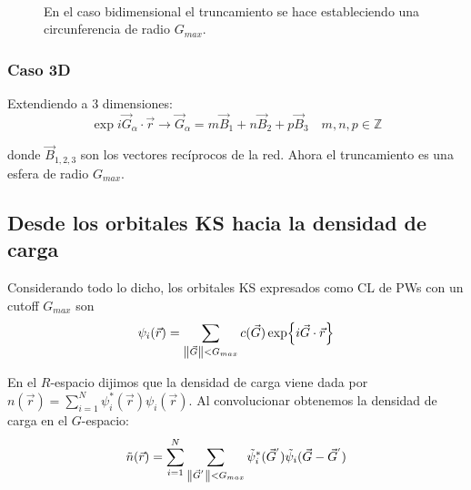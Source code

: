 \begin{figure}[H]
         \\
        \caption{En el caso bidimensional el truncamiento se hace estableciendo una circunferencia de radio $G_{max}$.}
        \label{fig:FT_2D}
    \end{figure}

\subsubsection{Caso 3D}

  Extendiendo a 3 dimensiones:
    $$\exp{i \vec{G}_{\alpha} \cdot \vec{r}} \rightarrow \vec{G}_{\alpha} = m \vec{B}_1 + n \vec{B}_2 + p \vec{B}_3 \quad m,n,p\in\mathbb{Z}$$

  donde $\vec{B}_{1,2,3}$ son los vectores recíprocos de la red. Ahora el truncamiento es una esfera de radio $G_{max}$.

\subsection{Desde los orbitales KS hacia la densidad de carga}

  Considerando todo lo dicho, los orbitales KS expresados como CL de PWs con un cutoff $G_{max}$ son
    $$\psi_i (\vec{r}) = \sum_{\norm{\vec{G}} < G_{max}} c(\vec{G}) \exp{i \vec{G} \cdot \vec{r}}$$

  En el $R$-espacio dijimos que la densidad de carga viene dada por $n(\vec{r}) = \sum_{i=1}^N \psi_i^{*} (\vec{r}) \psi_i (\vec{r})$. Al convolucionar obtenemos la densidad de carga en el $G$-espacio:
    $$\tilde{n}(\vec{r}) = \sum_{i=1}^N \sum_{\norm{\vec{G}^{'}} < G_{max}} \tilde{\psi}_i^{*} (\vec{G}^{'}) \tilde{\psi}_i (\vec{G} - \vec{G}^{'})$$

